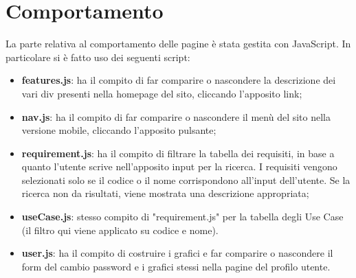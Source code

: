 \section{Comportamento}
La parte relativa al comportamento delle pagine è stata gestita con JavaScript. In particolare si è fatto uso dei seguenti script:
\begin{itemize}
	\item \textbf{features.js}: ha il compito di far comparire o nascondere la descrizione dei vari div presenti nella homepage del sito, cliccando l'apposito link;
	\item \textbf{nav.js}: ha il compito di far comparire o nascondere il menù del sito nella versione mobile, cliccando l'apposito pulsante;
	\item \textbf{requirement.js}: ha il compito di filtrare la tabella dei requisiti, in base a quanto l'utente scrive nell'apposito input per la ricerca. I requisiti vengono selezionati solo se il codice o il nome corrispondono all'input dell'utente. Se la ricerca non da risultati, viene mostrata una descrizione appropriata;
	\item \textbf{useCase.js}: stesso compito di "requirement.js" per la tabella degli Use Case (il filtro qui viene applicato su codice e nome).
	\item \textbf{user.js}: ha il compito di costruire i grafici e far comparire o nascondere il form del cambio password e i grafici stessi nella pagine del profilo utente.
\end{itemize}